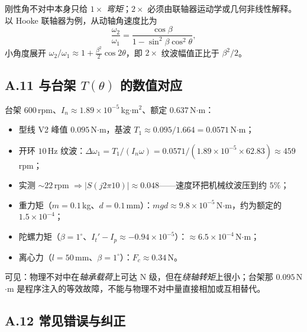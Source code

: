\documentclass[11pt,a4paper]{article}
\theoremstyle{remark}\newtheorem{remark}{注}
\begin{document}
刚性角不对中本身只给 $1\times$ \emph{弯矩}；$2\times$ 必须由联轴器运动学或几何非线性解释。以 Hooke 联轴器为例，从动轴角速度比为
\begin{equation}
\frac{\omega_2}{\omega_1}=\frac{\cos\beta}{1-\sin^2\beta\cos^2\theta},
\end{equation}
小角度展开 $\omega_2/\omega_1\approx1+\frac{\beta^2}{2}\cos2\theta$，即 $2\times$ 纹波幅值正比于 $\beta^2/2$。

\subsection*{A.11 与台架 $T(\theta)$ 的数值对应}

台架 $600$\,rpm、$I_n\approx1.89\times10^{-5}$\,kg$\cdot$m$^2$、额定 $0.637$\,N$\cdot$m：

\begin{itemize}
  \item 型线 V2 峰值 $0.095$\,N$\cdot$m，基波 $T_1\approx0.095/1.664=0.0571$\,N$\cdot$m；
  \item 开环 $10$\,Hz 纹波：$\Delta\omega_1=T_1/(I_n\omega)=0.0571/(1.89\times10^{-5}\times62.83)\approx459$\,rpm；
  \item 实测 $\sim22$\,rpm $\Rightarrow |S(j2\pi10)|\approx0.048$——速度环把机械纹波压到约 $5\%$；
  \item 重力矩（$m=0.1$\,kg、$d=0.1$\,mm）：$mgd\approx9.8\times10^{-5}$\,N$\cdot$m，约为额定的 $1.5\times10^{-4}$；
  \item 陀螺力矩（$\beta=1^\circ$、$I_t'-I_p\approx-0.94\times10^{-5}$）：$\approx6.5\times10^{-4}$\,N$\cdot$m；
  \item 离心力（$l=50$\,mm、$\beta=1^\circ$）：$F_c\approx0.34$\,N。
\end{itemize}

可见：物理不对中在\emph{轴承载荷}上可达 N 级，但在\emph{绕轴转矩}上很小；台架那 $0.095$\,N$\cdot$m 是程序注入的等效故障，不能与物理不对中量直接相加或互相替代。

\subsection*{A.12 常见错误与纠正}
\end{document}
